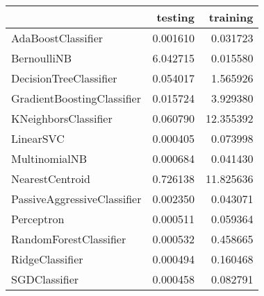 \begin{tabular}{lrr}
\toprule
{} &   testing &   training \\
\midrule
AdaBoostClassifier          &  0.001610 &   0.031723 \\
BernoulliNB                 &  6.042715 &   0.015580 \\
DecisionTreeClassifier      &  0.054017 &   1.565926 \\
GradientBoostingClassifier  &  0.015724 &   3.929380 \\
KNeighborsClassifier        &  0.060790 &  12.355392 \\
LinearSVC                   &  0.000405 &   0.073998 \\
MultinomialNB               &  0.000684 &   0.041430 \\
NearestCentroid             &  0.726138 &  11.825636 \\
PassiveAggressiveClassifier &  0.002350 &   0.043071 \\
Perceptron                  &  0.000511 &   0.059364 \\
RandomForestClassifier      &  0.000532 &   0.458665 \\
RidgeClassifier             &  0.000494 &   0.160468 \\
SGDClassifier               &  0.000458 &   0.082791 \\
\bottomrule
\end{tabular}
